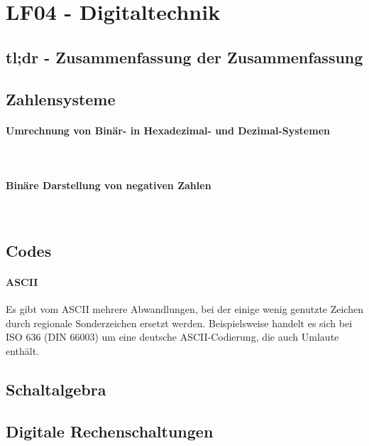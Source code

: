 \section{LF04 - Digitaltechnik}
%

\subsection{tl;dr - Zusammenfassung der Zusammenfassung}

\subsection{Zahlensysteme}

\paragraph{Umrechnung von Binär- in Hexadezimal- und Dezimal-Systemen}~\\
\paragraph{Binäre Darstellung von negativen Zahlen}~\\


\subsection{Codes}

\paragraph{ASCII}
Es gibt vom ASCII mehrere Abwandlungen, bei der einige wenig genutzte Zeichen durch regionale Sonderzeichen ersetzt werden. Beispielsweise handelt es sich bei ISO 636 (DIN 66003) um eine deutsche ASCII-Codierung, die auch Umlaute enthält.

\subsection{Schaltalgebra}

\subsection{Digitale Rechenschaltungen}

